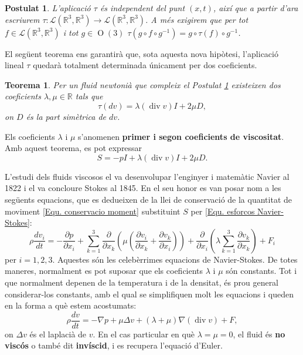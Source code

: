 \documentclass{article}
\numberwithin{equation}{section}
\DeclareMathOperator{\diver}{div}
\DeclareMathOperator{\Or}{O}
\newtheorem{teorema}{Teorema}[section]
\newtheorem{postulat}{Postulat}[section]
\begin{document}
\begin{postulat}\label{Pos: isotrop homogeni}
L'aplicaci\'{o} $\tau$ \'{e}s independent del punt $(x,t)$, aix\'{i} que a partir d'ara escriurem $\tau:\mathcal{L}(\mathbb{R}^3,\mathbb{R}^3)\rightarrow\mathcal{L}(\mathbb{R}^3,\mathbb{R}^3)$. A m\'{e}s exigirem que per tot $f\in\mathcal{L}(\mathbb{R}^3,\mathbb{R}^3)$ i tot $g\in\Or(3)$ $\tau(g\circ f\circ g^{-1})=g\circ\tau(f)\circ g^{-1}$.
\end{postulat}

El seg\"{u}ent teorema ens garantir\`{a} que, sota aquesta nova hip\`{o}tesi, l'aplicaci\'{o} lineal $\tau$ quedar\`{a} totalment determinada \'{u}nicament per dos coeficients.

\begin{teorema}
Per un fluid newtoni\`{a} que compleix el Postulat \ref{Pos: isotrop homogeni} existeixen dos coeficients $\lambda,\mu\in\mathbb{R}$ tals que
\[\tau(dv)=\lambda(\diver v)I+2\mu D,\]
on $D$ \'{e}s la part sim\`{e}trica de $dv$.
\end{teorema}

Els coeficients $\lambda$ i $\mu$ s'anomenen \textbf{primer i segon coeficients de viscositat}. Amb aquest teorema, es pot expressar
\begin{equation}\label{Equ. esforcos Navier-Stokes}
S=-pI+\lambda(\diver v)I+2\mu D.
\end{equation}

L'estudi dels fluids viscosos el va desenvolupar l'enginyer i matem\`{a}tic Navier al 1822 i el va concloure Stokes al 1845. En el seu honor es van posar nom a les seg\"{u}ents equacions, que es dedueixen de la llei de conservaci\'{o} de la quantitat de moviment \eqref{Equ. conservacio moment} substituint $S$ per \eqref{Equ. esforcos Navier-Stokes}:
\begin{equation}
\rho\frac{dv_i}{dt}=-\frac{\partial p}{\partial x_i}+\sum_{k=1}^3\frac{\partial}{\partial x_k}\left(\mu\left(\frac{\partial v_i}{\partial x_k}+\frac{\partial v_k}{\partial x_i}\right)\right)+\frac{\partial}{\partial x_i}\left(\lambda\sum_{k=1}^3\frac{\partial v_k}{\partial x_k}\right)+F_i
\end{equation}
per $i=1,2,3$. Aquestes s\'{o}n les celeb\`{e}rrimes equacions de Navier-Stokes. De totes maneres, normalment es pot suposar que els coeficients $\lambda$ i $\mu$ s\'{o}n constants. Tot i que normalment depenen de la temperatura i de la densitat, \'{e}s prou general considerar-los constants, amb el qual se simplifiquen molt les equacions i queden en la forma a qu\`{e} estem acostumats:
\begin{equation}
\rho\frac{dv}{dt}=-\nabla p+\mu\Delta v+(\lambda+\mu)\nabla(\diver v)+F,
\end{equation}
on $\Delta v$ \'{e}s el laplaci\`{a} de $v$. En el cas particular en qu\`{e} $\lambda=\mu=0$, el fluid \'{e}s \textbf{no visc\'{o}s} o tamb\'{e} dit \textbf{inv\'{i}scid}, i es recupera l'equaci\'{o} d'Euler.
\end{document}
